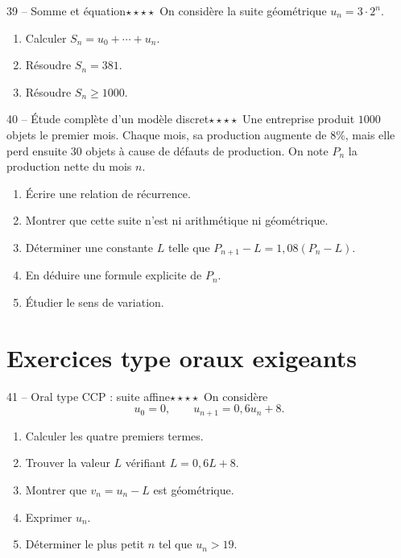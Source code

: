 \documentclass[11pt,a4paper]{article}
\newcommand{\quatreetoiles}{\(\star\star\star\star\)}
\begin{document}
\begin{exobox}{39 -- Somme et équation}{\quatreetoiles}
On considère la suite géométrique \(u_n=3\cdot 2^n\).
\begin{enumerate}[label=\alph*)]
  \item Calculer \(S_n=u_0+\cdots+u_n\).
  \item Résoudre \(S_n=381\).
  \item Résoudre \(S_n\geq 1000\).
\end{enumerate}
\end{exobox}

\begin{exobox}{40 -- Étude complète d'un modèle discret}{\quatreetoiles}
Une entreprise produit \(1000\) objets le premier mois. Chaque mois, sa production augmente de \(8\%\), mais elle perd ensuite \(30\) objets à cause de défauts de production. On note \(P_n\) la production nette du mois \(n\).
\begin{enumerate}[label=\alph*)]
  \item Écrire une relation de récurrence.
  \item Montrer que cette suite n'est ni arithmétique ni géométrique.
  \item Déterminer une constante \(L\) telle que \(P_{n+1}-L=1{,}08(P_n-L)\).
  \item En déduire une formule explicite de \(P_n\).
  \item Étudier le sens de variation.
\end{enumerate}
\end{exobox}

\section{Exercices type oraux exigeants}

\begin{exobox}{41 -- Oral type CCP : suite affine}{\quatreetoiles}
On considère
\[
u_0=0,\qquad u_{n+1}=0{,}6u_n+8.
\]
\begin{enumerate}[label=\alph*)]
  \item Calculer les quatre premiers termes.
  \item Trouver la valeur \(L\) vérifiant \(L=0{,}6L+8\).
  \item Montrer que \(v_n=u_n-L\) est géométrique.
  \item Exprimer \(u_n\).
  \item Déterminer le plus petit \(n\) tel que \(u_n>19\).
\end{enumerate}
\end{exobox}
\end{document}
